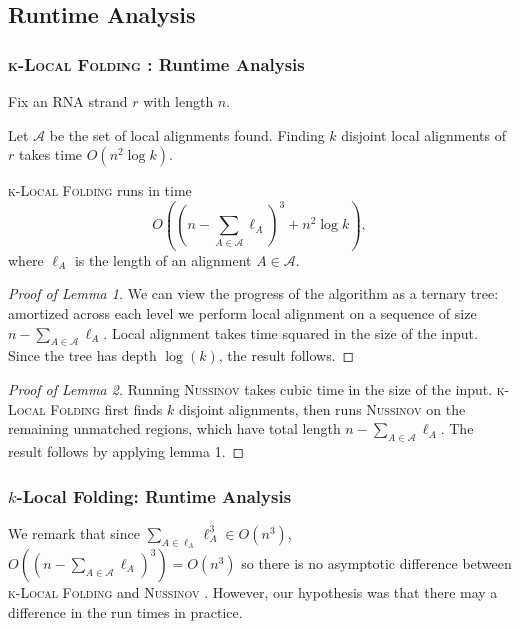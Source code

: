 \documentclass{beamer}
\newcommand{\klf}{\textsc{k-Local Folding} }
\newcommand{\rf}{\textsc{Nussinov} }
\newcommand{\al}{\mathscr{A}}
\begin{document}
\begin{frame}
\subsection{Runtime Analysis}
\frametitle{\klf: Runtime Analysis}
Fix an RNA strand $r$ with length $n$. 
\begin{lemma}[1]
Let $\al$ be the set of local alignments found. Finding $k$ disjoint local alignments of $r$ takes time $O(n^2\log k)$. 
\end{lemma}
\begin{lemma}[2]
\klf runs in time
\[O\left(\left(n-\sum_{A\in\al}\ell_A\right)^3+n^2\log k\right),\] where $\ell_A$ is the length of an alignment $A\in\al$. 
\end{lemma}
\end{frame}

\begin{frame}
\begin{proof}[Proof of Lemma 1]
We can view the progress of the algorithm as a ternary tree: amortized across each level we perform local alignment on a sequence of size $n-\sum_{A\in\al}\ell_A$. Local alignment takes time squared in the size of the input. Since the tree has depth $\log(k)$, the result follows. 
\end{proof}
\begin{proof}[Proof of Lemma 2]
Running \rf takes cubic time in the size of the input. \klf first finds $k$ disjoint alignments, then runs \rf on the remaining unmatched regions, which have total length $n-\sum_{A\in\al}\ell_A$.   The result follows by applying lemma 1. 
\end{proof}
\end{frame}

\begin{frame}
\frametitle{$k$-Local Folding: Runtime Analysis}
We remark that since $\sum_{A\in\ell_A}\ell_A^3\in O(n^3)$, $O((n-\sum_{A\in\al}\ell_A)^3)=O(n^3)$ so there is no asymptotic difference between \klf and \rf.
However, our hypothesis was that there may a difference in the run times in practice.  
\end{frame}
\end{document}
